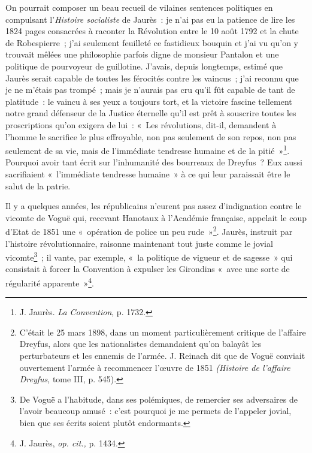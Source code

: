 \documentclass[french,twoside]{book} %
\begin{document}
\noindent On pourrait composer un beau recueil de vilaines sentences politiques en compulsant l’\emph{Histoire socialiste}  de Jaurès : je n’ai pas eu la patience de lire les 1824 pages consacrées à raconter la Révolution entre le 10 août 1792 et la chute de Robespierre ; j’ai seulement feuilleté ce fastidieux bouquin et j’ai vu qu’on y trouvait mêlées une philosophie parfois digne de monsieur Pantalon et une politique de pourvoyeur de guillotine. J’avais, depuis longtemps, estimé que Jaurès serait capable de toutes les férocités contre les vaincus ; j’ai reconnu que je ne m’étais pas trompé ; mais je n’aurais pas cru qu’il fût capable de tant de platitude : le vaincu à ses yeux a toujours tort, et la victoire fascine tellement notre grand défenseur de la Justice éternelle qu’il est prêt à souscrire toutes les proscriptions qu’on exigera de lui : « Les révolutions, dit-il, demandent à l’homme le sacrifice le plus effroyable, non pas seulement de son repos, non pas seulement de sa vie, mais de l’immédiate tendresse humaine et de la pitié »\footnote{ \noindent J. Jaurès. \emph{La Convention}, p. 1732.
 }. Pourquoi avoir tant écrit sur l’inhumanité des bourreaux de Dreyfus ? Eux aussi sacrifiaient « l’immédiate tendresse humaine » à ce qui leur paraissait être le salut de la patrie.\par
Il y a quelques années, les républicains n’eurent pas assez d’indignation contre le vicomte de Voguë qui, recevant Hanotaux à l’Académie française, appelait le coup d’Etat de 1851 une « opération de police un peu rude »\footnote{ \noindent C’était le 25 mars 1898, dans un moment particulièrement critique de l’affaire Dreyfus, alors que les nationalistes demandaient qu’on balayât les perturbateurs et les ennemis de l’armée. J. Reinach dit que de Voguë conviait ouvertement l’armée à recommencer l’œuvre de 1851 \emph{(Histoire de l’affaire Dreyfus}, tome III, p. 545).
 }. Jaurès, instruit par l’histoire révolutionnaire,  raisonne maintenant tout juste comme le jovial vicomte\footnote{ \noindent De Voguë a l’habitude, dans ses polémiques, de remercier ses adversaires de l’avoir beaucoup amusé : c’est pourquoi je me permets de l’appeler jovial, bien que ses écrits soient plutôt endormants.
 } ; il vante, par exemple, « la politique de vigueur et de sagesse » qui consistait à forcer la Convention à expulser les Girondins « avec une sorte de régularité apparente »\footnote{ \noindent J. Jaurès, \emph{op. cit.,} p. 1434.
 }.\par
\end{document}
